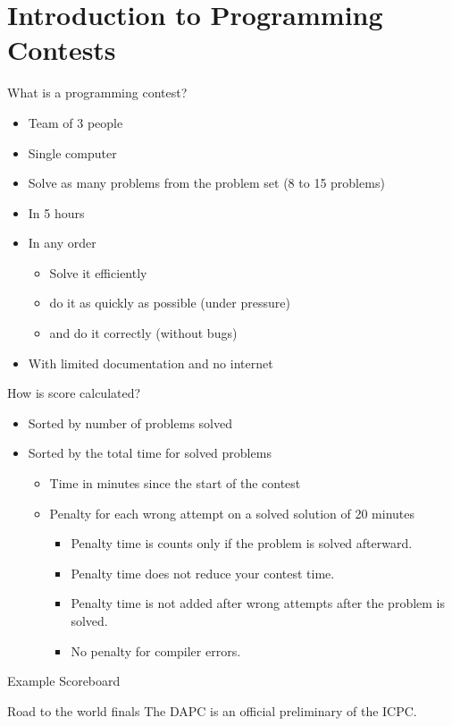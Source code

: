\documentclass[11pt,pdf, aspectratio=169]{beamer}
\begin{document}
  \section{Introduction to Programming Contests}
  \begin{frame}{What is a programming contest?}
    \begin{itemize}
      \item<1-> Team of 3 people
      \item<1-> Single computer
      \item<1-> Solve as many problems from the problem set (8 to 15 problems)
      \item<1-> In 5 hours
      \item<1-> In any order
      \begin{itemize}
        \item<2-> Solve it efficiently
        \item<2-> do it as quickly as possible (under pressure)
        \item<2-> and do it correctly (without bugs)
      \end{itemize}
      \item<3-> With limited documentation and no internet
    \end{itemize}
  \end{frame}
  \begin{frame}{How is score calculated?}
    \begin{itemize}
      \item<1-> Sorted by number of problems solved
      \item<2-> Sorted by the total time for solved problems
      \begin{itemize}
        \item<3->  Time in minutes since the start of the contest
        \item<3-> Penalty for each wrong attempt on a solved solution of 20 minutes
        \begin{itemize}
          \item<4-> Penalty time is counts only if the problem is solved afterward.
          \item<4-> Penalty time does not reduce your contest time.
          \item<4-> Penalty time is not added after wrong attempts after the problem is solved.
          \item<4-> No penalty for compiler errors.
        \end{itemize}
      \end{itemize}
    \end{itemize}
  \end{frame}
  {
    \begin{frame}{Example Scoreboard}
    \end{frame}
  }
  \begin{frame}{Road to the world finals}
    The DAPC is an official preliminary of the ICPC.
    
  \end{frame}
\end{document}
